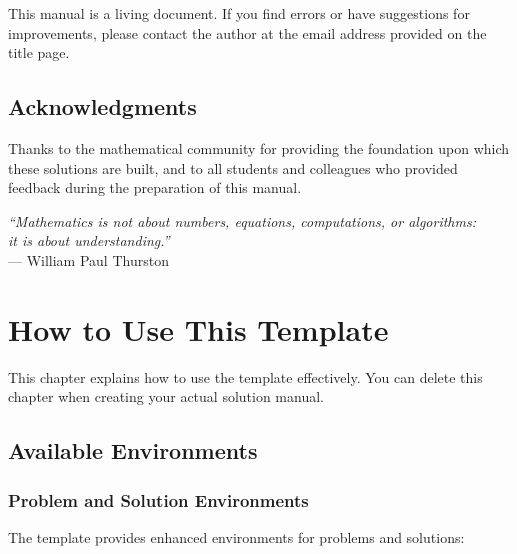 \documentclass[11pt, oneside, openany]{book}
\theoremstyle{definition}
\begin{document}
\begin{note}
This manual is a living document. If you find errors or have suggestions for 
improvements, please contact the author at the email address provided on the title page.
\end{note}

\section*{Acknowledgments}

Thanks to the mathematical community for providing the foundation upon which these 
solutions are built, and to all students and colleagues who provided feedback during 
the preparation of this manual.

\vfill
\begin{center}
\textit{``Mathematics is not about numbers, equations, computations, or algorithms:}\\
\textit{it is about understanding.''}\\
--- William Paul Thurston
\end{center}

\newpage
\tableofcontents
\newpage

\chapter*{How to Use This Template}

\begin{note}
This chapter explains how to use the template effectively. You can delete this chapter when creating your actual solution manual.
\end{note}

\section*{Available Environments}

\subsection*{Problem and Solution Environments}

The template provides enhanced environments for problems and solutions:
\end{document}
